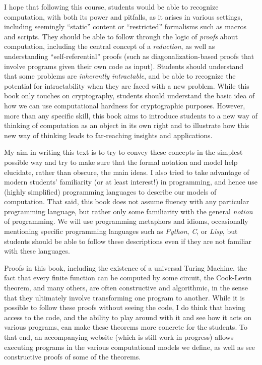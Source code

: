I hope that following this course, students would be able to recognize
computation, with both its power and pitfalls, as it arises in various
settings, including seemingly ``static'' content or ``restricted''
formalisms such as macros and scripts. They should be able to follow
through the logic of \emph{proofs} about computation, including the
central concept of a \emph{reduction}, as well as understanding
``self-referential'' proofs (such as diagonalization-based proofs that
involve programs given their own code as input). Students should
understand that some problems are \emph{inherently intractable}, and be
able to recognize the potential for intractability when they are faced
with a new problem. While this book only touches on cryptography,
students should understand the basic idea of how we can use
computational hardness for cryptographic purposes. However, more than
any specific skill, this book aims to introduce students to a new way of
thinking of computation as an object in its own right and to illustrate
how this new way of thinking leads to far-reaching insights and
applications.

My aim in writing this text is to try to convey these concepts in the
simplest possible way and try to make sure that the formal notation and
model help elucidate, rather than obscure, the main ideas. I also tried
to take advantage of modern students' familiarity (or at least
interest!) in programming, and hence use (highly simplified) programming
languages to describe our models of computation. That said, this book
does not assume fluency with any particular programming language, but
rather only some familiarity with the general \emph{notion} of
programming. We will use programming metaphors and idioms, occasionally
mentioning specific programming languages such as \emph{Python},
\emph{C}, or \emph{Lisp}, but students should be able to follow these
descriptions even if they are not familiar with these languages.

Proofs in this book, including the existence of a universal Turing
Machine, the fact that every finite function can be computed by some
circuit, the Cook-Levin theorem, and many others, are often constructive
and algorithmic, in the sense that they ultimately involve transforming
one program to another. While it is possible to follow these proofs
without seeing the code, I do think that having access to the code, and
the ability to play around with it and see how it acts on various
programs, can make these theorems more concrete for the students. To
that end, an accompanying website (which is still work in progress)
allows executing programs in the various computational models we define,
as well as see constructive proofs of some of the theorems.

